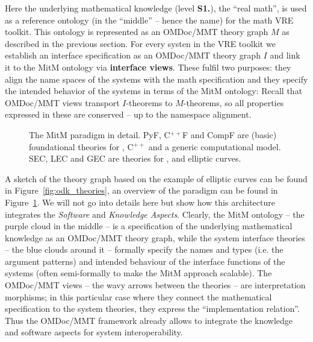 Here the underlying mathematical knowledge (level \textbf{S1.}), the ``real math'', is
used as a reference ontology (in the ``middle'' -- hence the name) for the math VRE
toolkit. This ontology is represented as an OMDoc/MMT theory graph $M$ as described in the
previous section. For every systen in the \pn VRE toolkit we establish an interface
specification as an OMDoc/MMT theory graph $I$ and link it to the MitM ontology via
\textbf{interface views}. These fulfil two purposes: they align the name spaces of the
systems with the math specification and they specify the intended behavior of the systems
in terms of the MitM ontology: Recall that OMDoc/MMT views transport $I$-theorems to
$M$-theorems, so all properties expressed in these are conserved -- up to the namespace
alignment.

\begin{figure}[ht]\centering
  \def\myxscale{3}\def\myyscale{1.2}
  
  \caption{The MitM paradigm in detail. PyF, C${}^{++}$F and CompF are (basic)
    foundational theories for \python, C${}^{++}$ and a generic computational model. SEC,
    LEC and GEC are theories for \SageMath, \LMFDB and \GAP elliptic curves.}\label{fig:mitm}
\end{figure}

A sketch of the theory graph based on the example of elliptic curves can be
found in Figure~\ref{fig:odk_theories}, an overview of the paradigm can be found
in Figure~\ref{fig:mitm}.  We will not go into details here but show how this
architecture integrates the \emph{Software} and \emph{Knowledge Aspects}.
Clearly, the MitM ontology -- the purple cloud in the middle -- is a
specification of the underlying mathematical knowledge as an OMDoc/MMT theory
graph, while the system interface theories -- the blue clouds around it --
formally specify the names and types (i.e. the argument patterns) and intended
behaviour of the interface functions of the systems (often semi-formally to make
the MitM approach scalable). The OMDoc/MMT views -- the wavy arrows between the
theories -- are interpretation morphisms; in this particular case where they
connect the mathematical specification to the system theories, they express the
``implementation relation''. Thus the OMDoc/MMT framework already allows to
integrate the knowledge and software aspects for system interoperability.

